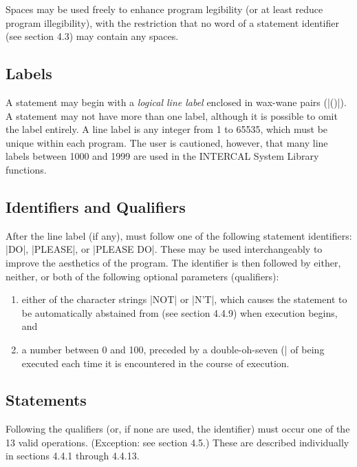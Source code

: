 Spaces may be used freely to enhance program legibility (or at least reduce
program illegibility), with the restriction that no word of a statement
identifier (see section 4.3) may contain any spaces.

\subsection{Labels}

A statement may begin with a {\sl logical line label} enclosed in wax-wane pairs
(|()|).  A statement may not have more than one label, although it is
possible to omit the label entirely.  A line label is any integer from 1 to
65535, which must be unique within each program.  The user is cautioned,
however, that many line labels between 1000 and 1999 are used in the
INTERCAL System Library functions.

\subsection{Identifiers and Qualifiers}

After the line label (if any), must follow one of the following statement
identifiers: |DO|, |PLEASE|, or |PLEASE DO|.  These may be used
interchangeably to improve the aesthetics of the program.  The identifier
is then followed by either, neither, or both of the following optional
parameters (qualifiers):
\begin{enumerate}
\item either of the character strings |NOT| or |N'T|, which causes the statement
to be automatically abstained from (see section 4.4.9) when execution
begins, and
\item a number between 0 and 100, preceded by a double-oh-seven
(|%
of being executed each time it is encountered in the course of execution.
\end{enumerate}







\subsection{Statements} 

Following the qualifiers (or, if none are used, the identifier) must occur
one of the 13 valid operations.  (Exception: see section 4.5.) These are
described individually in sections 4.4.1 through 4.4.13.

